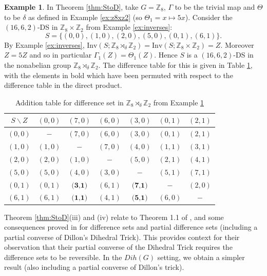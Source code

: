\documentclass[12pt, a4paper]{article}
\theoremstyle{definition}
\newtheorem{example}[theorem]{Example}
\begin{document}
\begin{example}\label{ex:(16,6,2)delta}
In Theorem \ref{thm:StoD}, take $G=\mathbb{Z}_8$, $\Gamma$ to be the trivial map and $\Theta$ to be $\delta$ as defined in Example \ref{ex:z8xz2} (so $\Theta_1=x \mapsto 5x$).  Consider the $(16,6,2)$-DS in $\mathbb{Z}_8 \times \mathbb{Z}_2$ from Example \ref{ex:inverses}:
$$S=\{(0,0),(1,0),(2,0),(5,0),(0,1),(6,1)\}.$$ 
By Example \ref{ex:inverses}, $\mathrm{Inv}(S;\mathbb{Z}_8 \rtimes_{\delta} \mathbb{Z}_2)=\mathrm{Inv}(S;\mathbb{Z}_8 \times \mathbb{Z}_2)=Z$.  Moreover $Z=5Z$ and so in particular $\Gamma_1(Z)=\Theta_1(Z)$.  Hence $S$ is a $(16,6,2)$-DS in the nonabelian group $\mathbb{Z}_8 \rtimes_{\delta} \mathbb{Z}_2$.  The difference table for this is given in Table \ref{table:(16,6,2)delta}, with the elements in bold which have been permuted with respect to the difference table in the direct product.
\end{example}

\begin{table}[h]
\renewcommand{\arraystretch}{1.2}
\centering
\setlength\tabcolsep{3pt}
\begin{tabular}{|c|cccccc|} 
\hline
$S \backslash Z$ & $(0,0)$ & $(7,0)$ & $(6,0)$ & $(3,0)$ & $(0,1)$ & $(2,1)$   \\ \hline
$(0,0)$ & $-$ & $(7,0)$ & $(6,0)$ & $(3,0)$ & $(0,1)$ & $(2,1)$
\\
$(1,0)$ & $(1,0)$ & $-$ & $(7,0)$ & $(4,0)$ & $(1,1)$ & $(3,1)$
\\
$(2,0)$ & $(2,0)$ & $(1,0)$ & $-$ & $(5,0)$ & $(2,1)$ & $(4,1)$
\\
$(5,0)$ & $(5,0)$ & $(4,0)$ & $(3,0)$ & $-$ & $(5,1)$ & $(7,1)$
\\
$(0,1)$ & $(0,1)$ & $\textbf{(3,1)}$ & $(6,1)$ & $\textbf{(7,1)}$ & $-$ & $(2,0)$ 
\\
$(6,1)$ & $(6,1)$ & $\textbf{(1,1)}$ & $(4,1)$ & $\textbf{(5,1)}$ & $(6,0)$ & $-$ 
\\
\hline
\end{tabular}
\caption{Addition table for difference set in $\mathbb{Z}_8 \rtimes_{\delta} \mathbb{Z}_2$ from Example \ref{ex:(16,6,2)delta}}
\label{table:(16,6,2)delta}
\end{table}

Theorem \ref{thm:StoD}(iii) and (iv) relate to Theorem 1.1 of \cite{Swa}, and some consequences proved in \cite{Swa} for difference sets and partial difference sets (including a partial converse of Dillon's Dihedral Trick).  This provides context for their observation that their partial converse of the Dihedral Trick requires the difference sets to be reversible.   In the $Dih(G)$ setting, we obtain a simpler result (also including a partial converse of Dillon's trick). 
\end{document}
